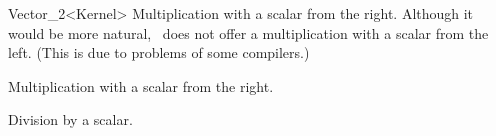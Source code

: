 \begin{ccRefClass} {Vector_2<Kernel>}
       {Multiplication with a scalar from the right. Although it would
        be more natural, \cgal\ does not offer a multiplication with a 
        scalar from the left. (This is due to problems of some compilers.)}

       {Multiplication with a scalar from the right.}



       {Division by a scalar.}

\ccSeeAlso
{}

\end{ccRefClass} 
